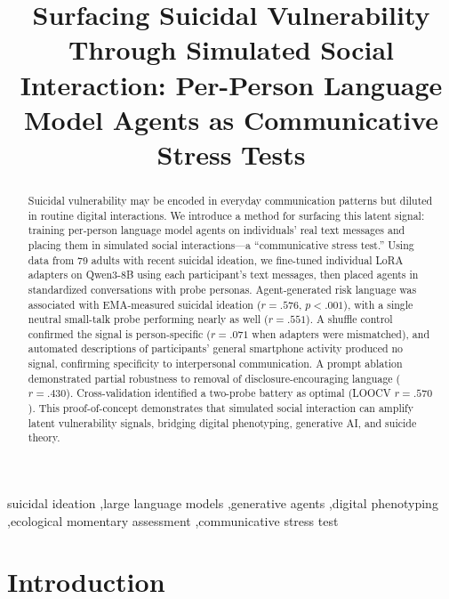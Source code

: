 \documentclass[review,12pt,authoryear]{elsarticle}
\begin{document}
\begin{frontmatter}

\title{Surfacing Suicidal Vulnerability Through Simulated Social Interaction: Per-Person Language Model Agents as Communicative Stress Tests}


\begin{abstract}
Suicidal vulnerability may be encoded in everyday communication patterns but diluted in routine digital interactions. We introduce a method for surfacing this latent signal: training per-person language model agents on individuals' real text messages and placing them in simulated social interactions---a ``communicative stress test.'' Using data from 79 adults with recent suicidal ideation, we fine-tuned individual LoRA adapters on Qwen3-8B using each participant's text messages, then placed agents in standardized conversations with probe personas. Agent-generated risk language was associated with EMA-measured suicidal ideation ($r = .576$, $p < .001$), with a single neutral small-talk probe performing nearly as well ($r = .551$). A shuffle control confirmed the signal is person-specific ($r = .071$ when adapters were mismatched), and automated descriptions of participants' general smartphone activity produced no signal, confirming specificity to interpersonal communication. A prompt ablation demonstrated partial robustness to removal of disclosure-encouraging language ($r = .430$). Cross-validation identified a two-probe battery as optimal (LOOCV $r = .570$). This proof-of-concept demonstrates that simulated social interaction can amplify latent vulnerability signals, bridging digital phenotyping, generative AI, and suicide theory.
\end{abstract}

\begin{keyword}
suicidal ideation \sep large language models \sep generative agents \sep digital phenotyping \sep ecological momentary assessment \sep communicative stress test
\end{keyword}

\end{frontmatter}

\linenumbers

\section{Introduction}
\end{document}
